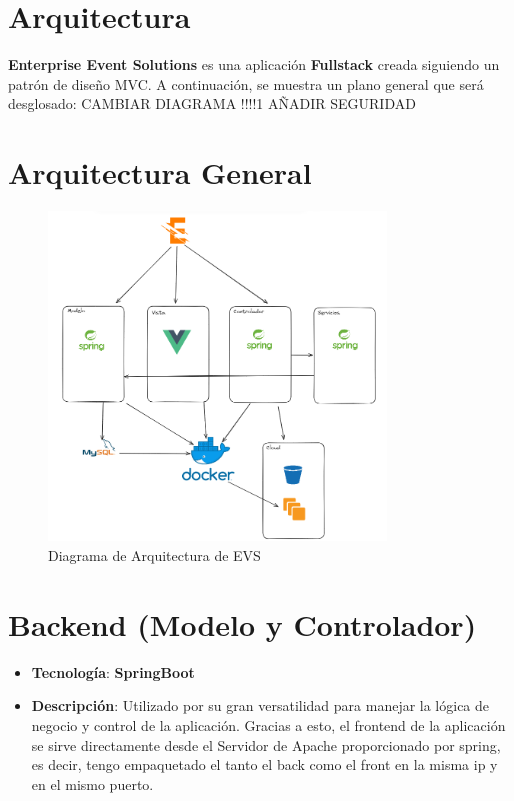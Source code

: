 \section{Arquitectura}
\textbf{Enterprise Event Solutions} es una aplicación \textbf{Fullstack} creada siguiendo un patrón de diseño MVC. A continuación, se muestra un plano general
que será desglosado:  CAMBIAR DIAGRAMA !!!!1 AÑADIR SEGURIDAD 

\section*{Arquitectura General}
\begin{figure}[h]
    \centering
    \includegraphics[width=0.8\textwidth]{Arquitectura.png} 
    \caption{Diagrama de Arquitectura de EVS}
    \label{fig:mvc_architecture}
\end{figure}
\newpage

\section*{Backend (Modelo y Controlador)}

\begin{itemize}
    \item \textbf{Tecnología}: \textbf{SpringBoot}
    \item \textbf{Descripción}: Utilizado por su gran versatilidad para manejar la lógica de negocio y control de la aplicación. Gracias a esto, el frontend
    de la aplicación se sirve directamente desde el Servidor de Apache proporcionado por spring, es decir, tengo empaquetado el tanto el back como el front en la misma ip
    y en el mismo puerto.
\end{itemize}

